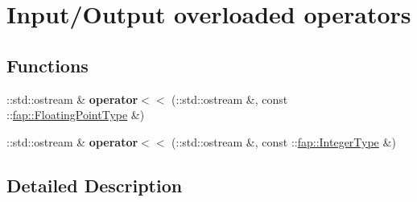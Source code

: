 \hypertarget{group__OPERATOR__OVERLOAD__INPUT__OUTPUT}{}\section{Input/\+Output overloaded operators}
\label{group__OPERATOR__OVERLOAD__INPUT__OUTPUT}
\subsection*{Functions}
\begin{DoxyCompactItemize}
\item 
\hypertarget{group__OPERATOR__OVERLOAD__INPUT__OUTPUT_ga0d9949e450b50364788252bc970bbaa7}{}\label{group__OPERATOR__OVERLOAD__INPUT__OUTPUT_ga0d9949e450b50364788252bc970bbaa7} 
\+::std\+::ostream \& {\bfseries operator$<$$<$} (\+::std\+::ostream \&, const \+::\hyperlink{classfap_1_1FloatingPointType}{fap\+::\+Floating\+Point\+Type} \&)
\item 
\hypertarget{group__OPERATOR__OVERLOAD__INPUT__OUTPUT_gad02d46ac3ef92ecf0388bce718713bb9}{}\label{group__OPERATOR__OVERLOAD__INPUT__OUTPUT_gad02d46ac3ef92ecf0388bce718713bb9} 
\+::std\+::ostream \& {\bfseries operator$<$$<$} (\+::std\+::ostream \&, const \+::\hyperlink{classfap_1_1IntegerType}{fap\+::\+Integer\+Type} \&)
\end{DoxyCompactItemize}


\subsection{Detailed Description}
